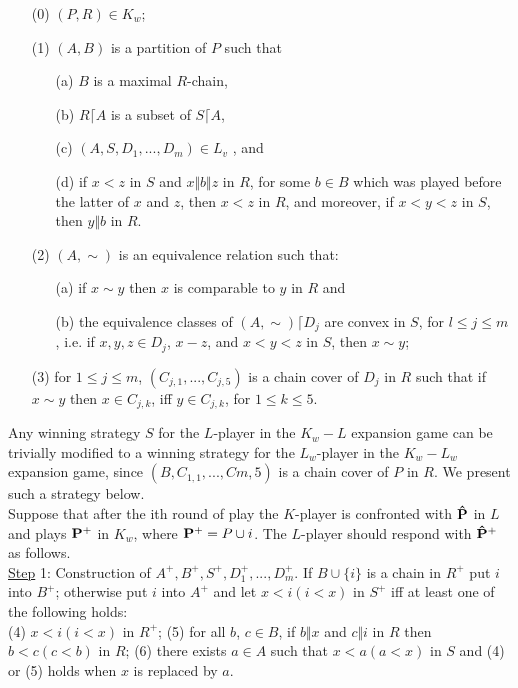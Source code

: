 \documentclass[twoside]{article}
\begin{document}
\begin{itemize}
  \item[(0)] $(P,R) \in K_w$;
  \item[(1)] $(A,B)$ is a partition of   $P$   such that
  \begin{itemize}
    \item[(a)] $B$   is a maximal $R$-chain,
    \item[(b)] $R\lceil A$   is a subset of   $S\lceil A$,
    \item[(c)] $(A,S,D_1,...,D_m) \in L_v$ , and
    \item[(d)] if   $x<z$   in   $S$   and   $x\Vert b\Vert z$   in   $R$, for some   $b\in B$ which was
played before the latter of   $x$   and   $z$,    then   $x<z$ in $R$, and moreover, if $x<y<z$   in $S$, then   $y\Vert b$   in $R$.
  \end{itemize}
  \item[(2)] 	$(A,\sim)$    is an equivalence relation such that:
%
%
  \begin{itemize}
    \item[(a)] if   $x\sim y$    then   $x$   is comparable to     $y$   in   $R$ and
    \item[(b)] the equivalence classes of $(A,\sim)\lceil D_j$    are convex in $S$, for
$l\leq j\leq m$,    i.e.    if   $x,y,z \in D_j$, $x-z$, and   $x<y<z$ in   $S$,    then   $x\sim y$;
   \end{itemize}
  \item[(3)] for    $1\leq j\leq m$,  $(C_{j,1},...,C_{j,5})$    is a chain cover of   $D_j$    in   $R$ such that if   $x\sim y$   then   $x\in C_{j,k}$,    iff   $y\in C_{j,k}$,   for $1\leq k\leq 5$.\\
\end{itemize}

Any winning strategy   $S$   for the $L$-player in the   $K_w-L$ expansion game can
be trivially modified to a winning strategy for the   $L_w$-player in the $K_w-L_w$ expansion game, since $(B,C_{1,1},...,C{m,5})$    is a chain cover of   $P$   in   $R$. We
present such a strategy below.\\
\indent Suppose that after the ith round of play the   $K$-player is confronted with $\mathbf{\hat{P}}$   in   $L$   and plays   $\mathbf{P^+}$   in $K_w$, where   $\mathbf{P^+} = P \cup {i}$.   The   $L$-player should respond with   $\mathbf{\hat{P}^+}$ as follows.\\
\newline
\underline{Step} 1: Construction of   $A^+,B^+,S^+,D_1^+,...,D_m^+$.    If   $B \cup \{i\}$    is a chain in $R^+$ put   $i$    into   $B^+$; otherwise put   $i$   into   $A^+$   and let   $x<i (i<x)$   in   $S^+$ iff at least one of the following holds:\\
\newline
(4) $x<i (i<x)$    in $R^+$;
(5) for all $b$, $c \in B$, if $b\Vert x$  and   $c\Vert i$   in   $R$   then   $b<c (c<b)$ in $R$;
(6) there exists   $a \in A$   such that   $x<a (a<x)$ in   $S$   and   (4)   or (5) holds when   $x$   is replaced by $a$.\\
\end{document}
